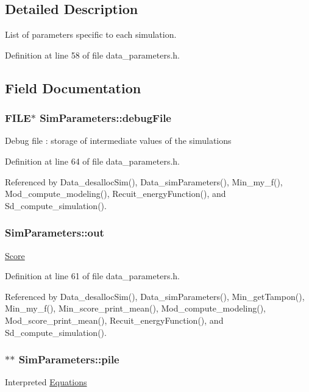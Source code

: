 \subsection{Detailed Description}
List of parameters specific to each simulation. 

Definition at line 58 of file data\_\-parameters.h.



\subsection{Field Documentation}
\hypertarget{structSimParameters_aad7fb1c37993627a2c2c04b7509ce3c0}{
\subsubsection[{debugFile}]{\setlength{\rightskip}{0pt plus 5cm}FILE$\ast$ {\bf SimParameters::debugFile}}}
\label{structSimParameters_aad7fb1c37993627a2c2c04b7509ce3c0}
Debug file : storage of intermediate values of the simulations 

Definition at line 64 of file data\_\-parameters.h.



Referenced by Data\_\-desallocSim(), Data\_\-simParameters(), Min\_\-my\_\-f(), Mod\_\-compute\_\-modeling(), Recuit\_\-energyFunction(), and Sd\_\-compute\_\-simulation().

\hypertarget{structSimParameters_a0dc198d74946f531dbf36860796bf108}{
\subsubsection[{out}]{ {\bf SimParameters::out}}}
\label{structSimParameters_a0dc198d74946f531dbf36860796bf108}
\hyperlink{structScore}{Score} 

Definition at line 61 of file data\_\-parameters.h.



Referenced by Data\_\-desallocSim(), Data\_\-simParameters(), Min\_\-getTampon(), Min\_\-my\_\-f(), Min\_\-score\_\-print\_\-mean(), Mod\_\-compute\_\-modeling(), Mod\_\-score\_\-print\_\-mean(), Recuit\_\-energyFunction(), and Sd\_\-compute\_\-simulation().

\hypertarget{structSimParameters_aecbff20f6647d4d348d3026e166a5c93}{
\subsubsection[{pile}]{$\ast$$\ast$ {\bf SimParameters::pile}}}
\label{structSimParameters_aecbff20f6647d4d348d3026e166a5c93}
Interpreted \hyperlink{structEquations}{Equations} 

